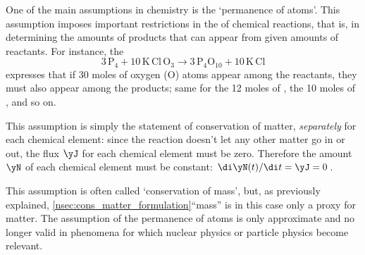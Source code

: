 One of the main assumptions in chemistry is the \enquote*{permanence of atoms}. This assumption imposes important restrictions in the  of chemical reactions, that is, in determining the amounts of products that can appear from given amounts of reactants.
%
For instance, the 
\begin{equation*}
  3\,\mathrm{P_{4}} + 10\,\mathrm{K\,Cl\,O_{3}}
  \to 3\,\mathrm{P_{4}O_{10}} + 10\,\mathrm{K\,Cl}
\end{equation*}
expresses that if 30 moles of oxygen (O) atoms appear among the reactants, they must also appear among the products; same for the 12 moles of , the 10 moles of , and so on.

This assumption is simply the statement of conservation of matter, \emph{separately} for each chemical element: since the reaction doesn't let any other matter go in or out, the flux $\yJ$ for each chemical element must be zero. Therefore the amount $\yN$ of each chemical element must be constant: $\di\yN(t)/\di t = \yJ = 0$.

This assumption is often called \enquote*{conservation of mass}, but, as previously explained, \autoref{nsec:cons_matter_formulation}{\enquote{mass} is in this case only a proxy for matter}. The assumption of the permanence of atoms is only approximate and no longer valid in phenomena for which nuclear physics or particle physics become relevant.

